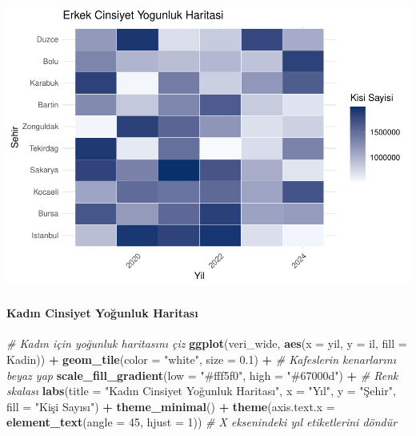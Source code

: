 \documentclass[
]{article}
\newenvironment{Shaded}{\begin{snugshade}}{\end{snugshade}}
\newcommand{\AttributeTok}[1]{\textcolor[rgb]{0.13,0.29,0.53}{#1}}
\newcommand{\CommentTok}[1]{\textcolor[rgb]{0.56,0.35,0.01}{\textit{#1}}}
\newcommand{\DecValTok}[1]{\textcolor[rgb]{0.00,0.00,0.81}{#1}}
\newcommand{\FloatTok}[1]{\textcolor[rgb]{0.00,0.00,0.81}{#1}}
\newcommand{\FunctionTok}[1]{\textcolor[rgb]{0.13,0.29,0.53}{\textbf{#1}}}
\newcommand{\NormalTok}[1]{#1}
\newcommand{\SpecialCharTok}[1]{\textcolor[rgb]{0.81,0.36,0.00}{\textbf{#1}}}
\newcommand{\StringTok}[1]{\textcolor[rgb]{0.31,0.60,0.02}{#1}}
\begin{document}
\includegraphics{cigdem_ucar_Rmarkdown_odevi_files/figure-latex/unnamed-chunk-15-1.pdf}

\paragraph{Kadın Cinsiyet Yoğunluk
Haritası}\label{kadux131n-cinsiyet-youx11funluk-haritasux131}

\begin{Shaded}
\begin{Highlighting}[]
\CommentTok{\# Kadın için yoğunluk haritasını çiz}
\FunctionTok{ggplot}\NormalTok{(veri\_wide, }\FunctionTok{aes}\NormalTok{(}\AttributeTok{x =}\NormalTok{ yil, }\AttributeTok{y =}\NormalTok{ il, }\AttributeTok{fill =}\NormalTok{ Kadin)) }\SpecialCharTok{+}
  \FunctionTok{geom\_tile}\NormalTok{(}\AttributeTok{color =} \StringTok{"white"}\NormalTok{, }\AttributeTok{size =} \FloatTok{0.1}\NormalTok{) }\SpecialCharTok{+} \CommentTok{\# Kafeslerin kenarlarını beyaz yap}
  \FunctionTok{scale\_fill\_gradient}\NormalTok{(}\AttributeTok{low =} \StringTok{"\#fff5f0"}\NormalTok{, }\AttributeTok{high =} \StringTok{"\#67000d"}\NormalTok{) }\SpecialCharTok{+} \CommentTok{\# Renk skalası}
  \FunctionTok{labs}\NormalTok{(}\AttributeTok{title =} \StringTok{"Kadın Cinsiyet Yoğunluk Haritası"}\NormalTok{,}
       \AttributeTok{x =} \StringTok{"Yıl"}\NormalTok{,}
       \AttributeTok{y =} \StringTok{"Şehir"}\NormalTok{,}
       \AttributeTok{fill =} \StringTok{"Kişi Sayısı"}\NormalTok{) }\SpecialCharTok{+}
  \FunctionTok{theme\_minimal}\NormalTok{() }\SpecialCharTok{+}
  \FunctionTok{theme}\NormalTok{(}\AttributeTok{axis.text.x =} \FunctionTok{element\_text}\NormalTok{(}\AttributeTok{angle =} \DecValTok{45}\NormalTok{, }\AttributeTok{hjust =} \DecValTok{1}\NormalTok{)) }\CommentTok{\# X eksenindeki yıl etiketlerini döndür}
\end{Highlighting}
\end{Shaded}
\end{document}
